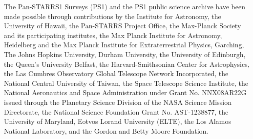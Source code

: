 \documentclass{aa}
\begin{document}
The Pan-STARRS1 Surveys (PS1) and the PS1 public science archive have been made possible through contributions by the Institute for Astronomy, the University of Hawaii, the Pan-STARRS Project Office, the Max-Planck Society and its participating institutes, the Max Planck Institute for Astronomy, Heidelberg and the Max Planck Institute for Extraterrestrial Physics, Garching, The Johns Hopkins University, Durham University, the University of Edinburgh, the Queen's University Belfast, the Harvard-Smithsonian Center for Astrophysics, the Las Cumbres Observatory Global Telescope Network Incorporated, the National Central University of Taiwan, the Space Telescope Science Institute, the National Aeronautics and Space Administration under Grant No. NNX08AR22G issued through the Planetary Science Division of the NASA Science Mission Directorate, the National Science Foundation Grant No. AST-1238877, the University of Maryland, Eotvos Lorand University (ELTE), the Los Alamos National Laboratory, and the Gordon and Betty Moore Foundation.



\end{document}

